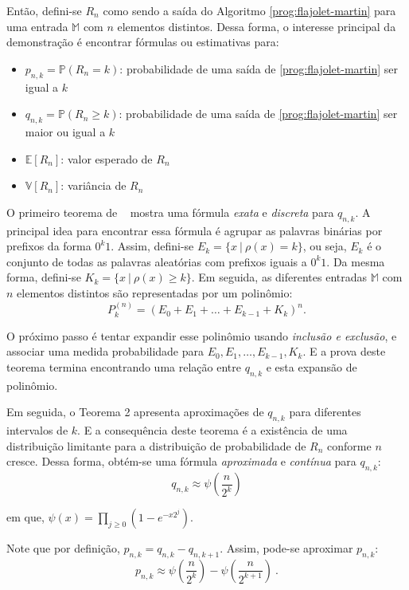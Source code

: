 Então, defini-se $R_n$ como sendo a saída do Algoritmo \ref{prog:flajolet-martin} para uma entrada $\mathbb{M}$
com $n$ elementos distintos. Dessa forma, o interesse principal da demonstração é encontrar fórmulas ou estimativas
para:
\begin{itemize}
  \item $p_{n,k} = \mathbb{P}(R_n = k)$: probabilidade de uma saída de \ref{prog:flajolet-martin} ser igual a $k$
  \item $q_{n,k} = \mathbb{P}(R_n \geq k)$: probabilidade de uma saída de \ref{prog:flajolet-martin} 
  ser maior ou igual a $k$
  \item $\mathbb{E}[R_n]$: valor esperado de $R_n$
  \item $\mathbb{V}[R_n]$: variância de $R_n$
\end{itemize}

O primeiro teorema de ~\citep{flajolet:martin:85} mostra uma fórmula \textit{exata} e \textit{discreta} para $q_{n,k}$. 
A principal idea para encontrar essa fórmula é agrupar as palavras binárias por prefixos da forma $0^k1$.
Assim, defini-se $E_k = \{ x  \ | \ \rho(x) = k \}$, ou seja, $E_k$ é o conjunto de todas as palavras aleatórias com prefixos
iguais a $0^k1$. Da mesma forma, defini-se $K_k = \{ x \ | \ \rho(x) \geq k \}$. Em seguida, as diferentes entradas $\mathbb{M}$
com $n$ elementos distintos são representadas por um polinômio:
\[ P_k^{(n)} = (E_0 + E_1 + \dots + E_{k-1} + K_k)^n .\]

O próximo passo é tentar expandir esse polinômio usando \textit{inclusão e exclusão}, 
e associar uma medida probabilidade para $E_0, E_1, \dots, E_{k-1}, K_k$. E a prova deste teorema termina encontrando uma relação entre $q_{n,k}$
e esta expansão de polinômio.

Em seguida, o Teorema 2 apresenta aproximações de $q_{n,k}$ para diferentes intervalos de $k$.
E a consequência deste teorema é a existência de uma distribuição limitante para a distribuição
de probabilidade de $R_n$ conforme $n$ cresce. Dessa forma, obtém-se uma fórmula \textit{aproximada} e \textit{contínua}
para $q_{n,k}$:
\[ q_{n,k} \approx \psi(\frac{n}{2^k}) \]

em que, $\psi(x) = \prod_{j \geq 0} (1 - e^{-x2^j})$.

Note que por definição, $p_{n,k} = q_{n,k} - q_{n,k+1}$. Assim, pode-se aproximar $p_{n,k}$:
\[ p_{n,k} \approx \psi(\frac{n}{2^k}) - \psi(\frac{n}{2^{k+1}}) \ . \]